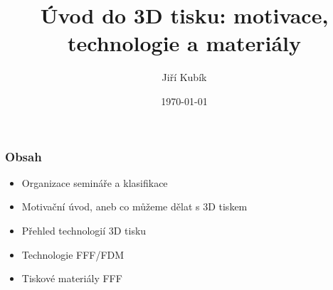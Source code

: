 \documentclass[aspectratio=169]{beamer}
\author{Jiří Kubík}
\title{Úvod do 3D tisku: motivace, technologie a materiály}
\date{\today}
\institute{%
\vspace{0.25em}
   {\bf \ps}\\ 
\vspace{0.25em}
   {\bf 2022}\\ 
\vspace{0.25em}
   {\GyBot}\\
\vspace{0.25em}
   {rev. 2022-10-1}
}
\begin{document}
    \begin{frame}
        \titlepage
    \end{frame}

    \begin{frame}[t]
        \frametitle{Obsah}
        \begin{itemize}
            \item Organizace semináře a klasifikace
            \item Motivační úvod, aneb co můžeme dělat s 3D tiskem
            \item Přehled technologií 3D tisku
            \item Technologie FFF/FDM
            \item Tiskové materiály FFF
        \end{itemize}
    \end{frame}

    
    
    
    
    
    
    
\end{document}
